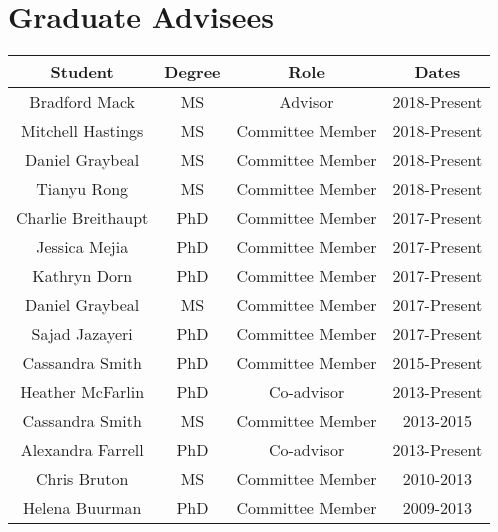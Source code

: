 \documentclass[margin,line]{res}
\begin{document}
\begin{resume}
\\
\section{\sc Graduate Advisees}
\begin{table}[ht]
\begin{tabular}{c c c c}
\hline\hline
Student & Degree & Role & Dates\\
\hline
Bradford Mack & MS & Advisor & 2018-Present\\
Mitchell Hastings & MS & Committee Member & 2018-Present\\
Daniel Graybeal & MS & Committee Member & 2018-Present\\
Tianyu Rong & MS & Committee Member & 2018-Present\\
Charlie Breithaupt & PhD & Committee Member & 2017-Present\\
Jessica Mejia & PhD & Committee Member & 2017-Present\\
Kathryn Dorn & PhD & Committee Member & 2017-Present\\
Daniel Graybeal & MS & Committee Member & 2017-Present\\
Sajad Jazayeri & PhD & Committee Member & 2017-Present\\
Cassandra Smith	& PhD & Committee Member & 2015-Present\\
Heather McFarlin & PhD & Co-advisor & 2013-Present\\
Cassandra Smith	& MS & Committee Member & 2013-2015\\
Alexandra Farrell & PhD & Co-advisor & 2013-Present\\
Chris Bruton & MS & Committee Member & 2010-2013\\
Helena Buurman & PhD & Committee Member & 2009-2013\\
\hline
\end{tabular}
\label{table:nonlin}
\end{table}

\begin{comment}

\end{comment}
\end{resume}
\end{document}
